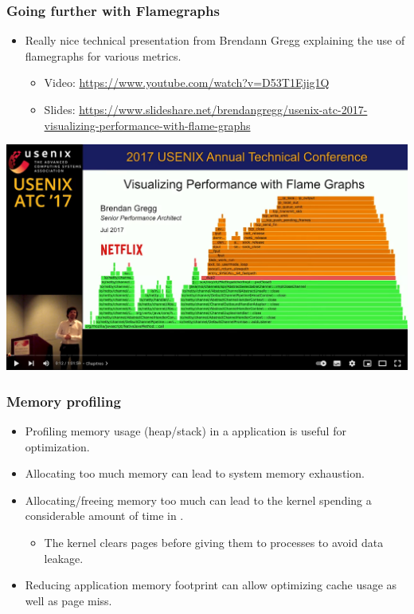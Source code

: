\begin{frame}[fragile]
  \frametitle{Going further with Flamegraphs}
  \begin{itemize}
    \item Really nice technical presentation from Brendann Gregg explaining
          the use of flamegraphs for various metrics.
    \begin{itemize}
      \item Video: \url{https://www.youtube.com/watch?v=D53T1Ejig1Q}
      \item Slides: \url{https://www.slideshare.net/brendangregg/usenix-atc-2017-visualizing-performance-with-flame-graphs}
    \end{itemize}
  \end{itemize}
  \begin{center}
  \center\includegraphics[height=0.5\textheight]{slides/debugging-application-profiling/flamegraph_atc20.png}
  \end{center}
\end{frame}

\begin{frame}
  \frametitle{Memory profiling}
  \begin{itemize}
    \item Profiling memory usage (heap/stack) in a application is useful for
          optimization.
    \item Allocating too much memory can lead to system memory exhaustion.
    \item Allocating/freeing memory too much can lead to the kernel spending a
          considerable amount of time in .
    \begin{itemize}
      \item The kernel clears pages before giving them to processes to
            avoid data leakage.
    \end{itemize}
    \item Reducing application memory footprint can allow optimizing cache usage
          as well as page miss.
  \end{itemize}
\end{frame}

